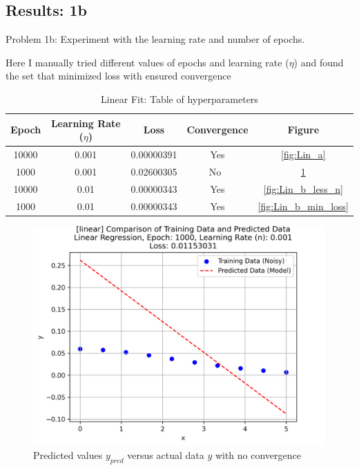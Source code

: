 \documentclass[letterpaper, 10 pt, conference]{ieeeconf}  %
\begin{document}
\subsection{Results: 1b}
Problem 1b: Experiment with the learning rate and number of epochs.

Here I manually tried different values of epochs and learning rate ($\eta$) and found the set that minimized loss with ensured convergence

\begin{table}[h]
   \centering
   \caption{Linear Fit: Table of hyperparameters}
   \label{tab:lin_param}
   \begin{tabular}{|c|c|c|c|c|}
      \hline
      Epoch & Learning Rate ($\eta$) & Loss & Convergence & Figure\\
      \hline
      10000 & 0.001 & 0.00000391 & Yes & \ref{fig:Lin_a}\\
      \hline
      1000 & 0.001 & 0.02600305 & No\ & \ref{fig:Lin_b_less_e}\\
      \hline
      10000 & 0.01 & 0.00000343 & Yes & \ref{fig:Lin_b_less_n}\\
      \hline
      1000 & 0.01 & 0.00000343 & Yes & \ref{fig:Lin_b_min_loss}\\
      \hline
   \end{tabular}
   
\end{table}


\begin{figure}[h!]
   \centering
   \includegraphics[width=0.8\linewidth]{../Figures/linear_regression_e_1000_n_0.001.png}
   \caption{Predicted values $y_{pred}$ versus actual data $y$ with no convergence}
   \label{fig:Lin_b_less_e}
\end{figure}
\end{document}
